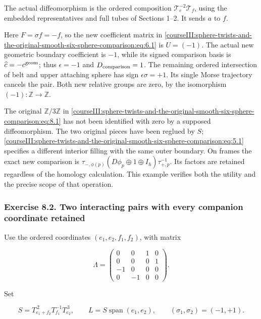 The actual diffeomorphism is the ordered composition \(\mathcal T_e^{-2}\mathcal T_f\), using the embedded representatives and full tubes of Sections 1--2. It sends \(a\) to \(f\).

Here \(F=\sigma f=-f\), so the new coefficient matrix in \eqref{courseIII:sphere-twists-and-the-original-smooth-six-sphere-comparison:eq:6.1} is \(U=(-1)\). The actual new geometric boundary coefficient is \(-1\), while its signed comparison basis is \(\widehat c=-c^{\rm geom}\); thus \(\epsilon=-1\) and \(D_{\rm comparison}=1\). The remaining ordered intersection of belt and upper attaching sphere has sign \(\epsilon\sigma=+1\). Its single Morse trajectory cancels the pair. Both new relative groups are zero, by the isomorphism \((-1):\mathbb Z\to\mathbb Z\).

The original \(\mathbb Z/3\mathbb Z\) in \eqref{courseIII:sphere-twists-and-the-original-smooth-six-sphere-comparison:eq:8.1} has not been identified with zero by a supposed diffeomorphism. The two original pieces have been reglued by \(S\); \eqref{courseIII:sphere-twists-and-the-original-smooth-six-sphere-comparison:eq:5.1} specifies a different interior filling with the same outer boundary. On frames the exact new comparison is \(\tau_{-,\phi(p)}(D\phi_p\oplus1\oplus I_h)\tau_{+,p}^{-1}\). Its factors are retained regardless of the homology calculation. This example verifies both the utility and the precise scope of that operation.

\subsubsection{Exercise 8.2. Two interacting pairs with every companion coordinate retained}
\label{courseIII:sphere-twists-and-the-original-smooth-six-sphere-comparison:exercise-8.2}

Use the ordered coordinates \((e_1,e_2,f_1,f_2)\), with matrix

\begin{equation}
\Lambda=\begin{pmatrix}0&0&1&0\\0&0&0&1\\-1&0&0&0\\0&-1&0&0\end{pmatrix}.
 \label{courseIII:sphere-twists-and-the-original-smooth-six-sphere-comparison:eq:8.4}
\end{equation}

Set

\begin{equation}
S=T_{e_1+f_2}^{\,2}T_{f_1}^{-1}T_{e_2}^{\,3},\qquad
 L=S\operatorname{span}(e_1,e_2),\qquad
                  (\sigma_1,\sigma_2)=(-1,+1).
 \label{courseIII:sphere-twists-and-the-original-smooth-six-sphere-comparison:eq:8.5}
\end{equation}

